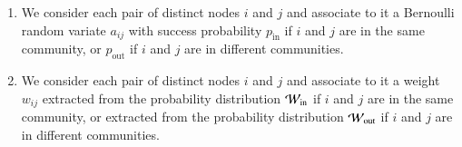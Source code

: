 \documentclass[a4paper,pre,superscriptaddress,floatfix,nofootinbib,twocolumn]{revtex4-1}
\begin{document}
\begin{enumerate}


    \item We consider each pair of distinct nodes $i$ and $j$ and associate to it a Bernoulli random variate $a_{ij}$
    with success probability $p_\text{in}$ if $i$ and $j$ are in the same community, or $p_\text{out}$ if $i$ and $j$ are in different communities.


    \item
     We consider each pair of distinct nodes $i$ and $j$ and
    associate to it a weight $w_{ij}$ extracted from the probability distribution ${\cal W}_\text{in}$ if $i$ and $j$ are in the same community, or extracted from the probability distribution ${\cal W}_\text{out}$ if $i$ and $j$ are in different communities.
\end{enumerate}
\end{document}
